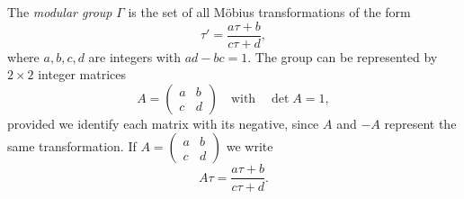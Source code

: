 The \emph{modular group} $\Gamma$ is the set of all M\"obius transformations of the form
$$\tau' = \frac{a\tau + b}{c\tau + d},$$
where $a, b, c, d$ are integers with $ad - bc = 1$.
The group can be represented by $2 \times 2$ integer matrices
$$A = \begin{pmatrix} a & b \\ c & d \end{pmatrix} \quad \text{with} \quad \det A = 1,$$
provided we identify each matrix with its negative, since $A$ and $-A$ represent the same transformation.
If $A = \begin{pmatrix} a & b \\ c & d \end{pmatrix}$ we write
$$A\tau = \frac{a\tau + b}{c\tau + d}.$$

